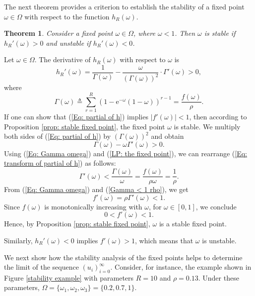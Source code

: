 \documentclass{IEEEtran}
\newtheorem{theorem}{Theorem}
\begin{document}
The next theorem provides a criterion to establish the stability of a fixed point $\omega \in \Omega$ with respect to the function $h_R(\omega)$.
\begin{theorem} \label{stability}
Consider a fixed point $\omega \in \Omega$, where $\omega < 1$. Then $\omega$ is stable if $h_R'(\omega) > 0$ and unstable if $h_R'(\omega) < 0$.
\end{theorem}
\begin{IEEEproof}
Let $\omega \in \Omega$. The derivative of $h_R(\omega)$ with respect to $\omega$ is
\begin{equation} \label{Eq: partial of h}
h_R'(\omega) =  \frac{1}{\Gamma(\omega)} -  \frac{\omega}{(\Gamma(\omega))^2} \cdot \Gamma'(\omega)  >  0,
\end{equation}
where
\begin{equation} \label{Eq: Gamma omega}
\Gamma(\omega) \triangleq \sum_{r=1}^{R}\left(1 - \mathrm{e}^{-\omega}(1-\omega)\right)^{r-1} = \frac{f(\omega)}{\rho}.
\end{equation}
If one can show that (\ref{Eq: partial of h}) implies $|f'(\omega)|<1$, then according to Proposition \ref{prop: stable fixed point}, the fixed
point $\omega$ is stable. We multiply both sides of (\ref{Eq: partial of h}) by $(\Gamma(\omega))^2$ and obtain
\begin{equation} \label{Eq: transform of partial of h}
\Gamma(\omega) - \omega \Gamma'(\omega) > 0.
\end{equation}
Using (\ref{Eq: Gamma omega}) and (\ref{LP: the fixed point}), we can rearrange (\ref{Eq: transform of partial of h}) as follows:
\begin{equation} \label{Gamma < 1 rho}
\Gamma'(\omega) < \frac{\Gamma(\omega)}{\omega} = \frac{f(\omega)}{\rho \omega} = \frac{1}{\rho}.
\end{equation}
From (\ref{Eq: Gamma omega}) and (\ref{Gamma < 1 rho}), we get \[f'(\omega) = \rho \Gamma'(\omega) < 1.\]
Since $f(\omega)$ is monotonically increasing with $\omega$, for $\omega \in [0,1]$, we conclude
\[0 < f'(\omega) < 1.\]
Hence, by Proposition \ref{prop: stable fixed point}, $\omega$ is a stable fixed point.

Similarly, $h_R'(\omega) < 0$ implies $f'(\omega) > 1$, which means that $\omega$ is unstable.

\end{IEEEproof}


We next show how the stability analysis of the fixed points helps to determine the limit of the sequence $(u_i)_{i=0}^{\infty}$. Consider, for
instance, the example shown in Figure \ref{stability example} with parameters $R=10$ and $\rho=0.13$. Under these parameters, $\Omega = \{\omega_1,
\omega_2, \omega_3\} = \{0.2, 0.7, 1\}$.
\end{document}
